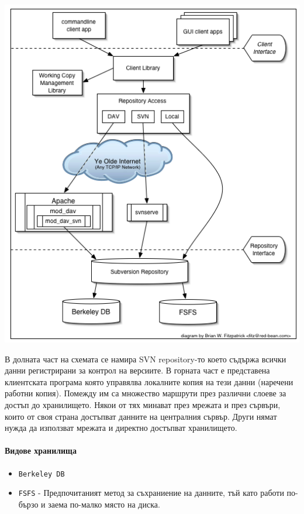 \documentclass[a4paper]{article}
\begin{document}
    \includegraphics[scale=0.5]{svn_architecture}

    В долната част на схемата се намира SVN repository-то което съдържа всички
    данни регистрирани за контрол на версиите. В горната част е представена
    клиентската програма която управялва локалните копия на тези данни
    (наречени работни копия). Помежду им са множество маршрути през различни
    слоеве за достъп до хранилището. Някои от тях минават през мрежата и през
    сървъри, които от своя страна достъпват данните на централния сървър. Други
    нямат нужда да използват мрежата и директно достъпват хранилището.

    \paragraph{Видове хранилища}

    \begin{itemize}
      \item \texttt{Berkeley DB}
      \item \texttt{FSFS} - Предпочитаният метод за съхраниение на данните, тъй като работи по-бързо и заема по-малко място на диска.
    \end{itemize}
\end{document}
